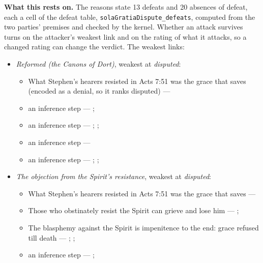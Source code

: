 \documentclass[11pt]{article}
\begin{document}
\par\noindent\textbf{What this rests on.} The reasons state 13 defeats and 20 absences of defeat, each a cell of the defeat table, \texttt{sola\allowbreak{}Gratia\allowbreak{}Dispute\_\allowbreak{}defeats}, computed from the two parties' premises and checked by the kernel. Whether an attack survives turns on the attacker's weakest link and on the rating of what it attacks, so a changed rating can change the verdict. The weakest links:
\begin{itemize}
\item \emph{Reformed (the Canons of Dort)}, weakest at \emph{disputed}:
\begin{itemize}
\item What Stephen’s hearers resisted in Acts 7:51 was the grace that saves (encoded as a denial, so it ranks disputed) --- \cite[Canons of Dort, III/IV, art. 9]{schaff-creeds-christendom-3-1977}
\item an inference step --- \cite[ad loc. Eph 2:8]{robertson-word-pictures-4-1931}; \cite[228--229]{calvin-galatians-ephesians-1854}
\item an inference step --- \cite[600]{arminius-works-1-1825}; \cite[681]{arminius-works-1-1825}; \cite[Five Arminian Articles (1610), art. 4]{schaff-creeds-christendom-3-1977}
\item an inference step --- \cite[527--565]{arminius-works-3-1853}
\item an inference step --- \cite[Solid Declaration II.89]{concordia-triglotta-1921}; \cite[Solid Declaration II.60]{concordia-triglotta-1921}; \cite[Solid Declaration XI.41]{concordia-triglotta-1921}
\end{itemize}
\item \emph{The objection from the Spirit’s resistance}, weakest at \emph{disputed}:
\begin{itemize}
\item What Stephen’s hearers resisted in Acts 7:51 was the grace that saves --- \cite[Five Arminian Articles (1610), art. 4]{schaff-creeds-christendom-3-1977}
\item Those who obstinately resist the Spirit can grieve and lose him --- \cite[Solid Declaration II.83]{concordia-triglotta-1921}; \cite[Solid Declaration XI.42]{concordia-triglotta-1921}
\item The blasphemy against the Spirit is impenitence to the end: grace refused till death --- \cite[325]{npnf1-06-1888}; \cite[II-II q.14 a.1]{aquinas-summa-1920}; \cite[74]{calvin-harmony-evangelists-2-1845}
\item an inference step --- \cite[325]{npnf1-06-1888}; \cite[On Rebuke and Grace, ch. 43]{npnf1-05-1887}

\end{itemize}
\end{itemize}
\end{document}
